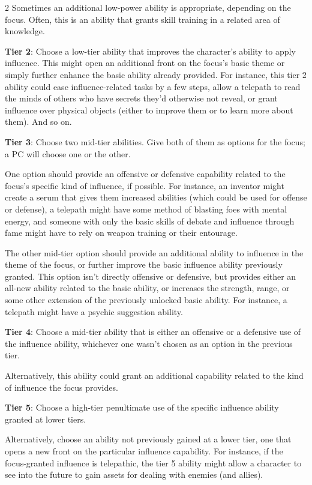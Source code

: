 \begin{multicols}{2}
Sometimes an additional low-power ability is appropriate, depending on the focus. Often, this is an ability that grants skill training in a related area of knowledge.

\textbf{Tier 2}: Choose a low-tier ability that improves the character’s ability to apply influence. This might open an additional front on the focus’s basic theme or simply further enhance the basic ability already provided. For instance, this tier 2 ability could ease influence-related tasks by a few steps, allow a telepath to read the minds of others who have secrets they’d otherwise not reveal, or grant influence over physical objects (either to improve them or to learn more about them). And so on.

\textbf{Tier 3}: Choose two mid-tier abilities. Give both of them as options for the focus; a PC will choose one or the other.

One option should provide an offensive or defensive capability related to the focus’s specific kind of influence, if possible. For instance, an inventor might create a serum that gives them increased abilities (which could be used for offense or defense), a telepath might have some method of blasting foes with mental energy, and someone with only the basic skills of debate and influence through fame might have to rely on weapon training or their entourage.

The other mid-tier option should provide an additional ability to influence in the theme of the focus, or further improve the basic influence ability previously granted. This option isn’t directly offensive or defensive, but provides either an all-new ability related to the basic ability, or increases the strength, range, or some other extension of the previously unlocked basic ability. For instance, a telepath might have a psychic suggestion ability.

\textbf{Tier 4}: Choose a mid-tier ability that is either an offensive or a defensive use of the influence ability, whichever one wasn’t chosen as an option in the previous tier.

Alternatively, this ability could grant an additional capability related to the kind of influence the focus provides.

\textbf{Tier 5}: Choose a high-tier penultimate use of the specific influence ability granted at lower tiers. 

Alternatively, choose an ability not previously gained at a lower tier, one that opens a new front on the particular influence capability. For instance, if the focus-granted influence is telepathic, the tier 5 ability might allow a character to see into the future to gain assets for dealing with enemies (and allies). 


\end{multicols}
